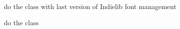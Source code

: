
\begin{DoxyRefList}
\item[\label{todo__todo000001}%
\hypertarget{todo__todo000001}{}%
Class \hyperlink{class_symp_1_1_line_edit}{Symp\-:\-:Line\-Edit} ]do the class with last version of Indielib font management  
\item[\label{todo__todo000002}%
\hypertarget{todo__todo000002}{}%
Class \hyperlink{class_symp_1_1_scroll_area}{Symp\-:\-:Scroll\-Area} ]do the class 
\end{DoxyRefList}
